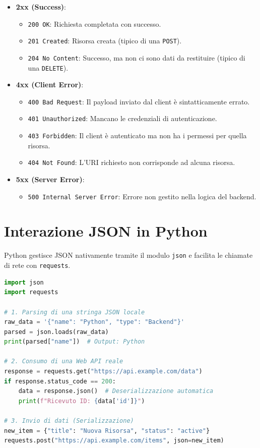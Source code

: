 \documentclass[11pt,a4paper]{report}
\begin{document}
\begin{itemize}[leftmargin=3em]
    \item \textbf{2xx (Success)}:
    \begin{itemize}
        \item \texttt{200 OK}: Richiesta completata con successo.
        \item \texttt{201 Created}: Risorsa creata (tipico di una \texttt{POST}).
        \item \texttt{204 No Content}: Successo, ma non ci sono dati da restituire (tipico di una \texttt{DELETE}).
    \end{itemize}
    \item \textbf{4xx (Client Error)}:
    \begin{itemize}
        \item \texttt{400 Bad Request}: Il payload inviato dal client è sintatticamente errato.
        \item \texttt{401 Unauthorized}: Mancano le credenziali di autenticazione.
        \item \texttt{403 Forbidden}: Il client è autenticato ma non ha i permessi per quella risorsa.
        \item \texttt{404 Not Found}: L'URI richiesto non corrisponde ad alcuna risorsa.
    \end{itemize}
    \item \textbf{5xx (Server Error)}:
    \begin{itemize}
        \item \texttt{500 Internal Server Error}: Errore non gestito nella logica del backend.
    \end{itemize}
\end{itemize}

\section{Interazione JSON in Python}
Python gestisce JSON nativamente tramite il modulo \texttt{json} e facilita le chiamate di rete con \texttt{requests}.

\begin{lstlisting}[language=Python, caption=Gestione JSON e API in Python]
import json
import requests

# 1. Parsing di una stringa JSON locale
raw_data = '{"name": "Python", "type": "Backend"}'
parsed = json.loads(raw_data)
print(parsed["name"])  # Output: Python

# 2. Consumo di una Web API reale
response = requests.get("https://api.example.com/data")
if response.status_code == 200:
    data = response.json()  # Deserializzazione automatica
    print(f"Ricevuto ID: {data['id']}")

# 3. Invio di dati (Serializzazione)
new_item = {"title": "Nuova Risorsa", "status": "active"}
requests.post("https://api.example.com/items", json=new_item)
\end{lstlisting}
\end{document}
